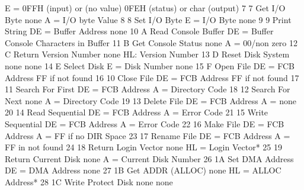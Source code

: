                                          E = 0FFH (input) or  (no value)
                                             0FEH (status) or 
                                             char (output)
 7           7   Get I/O Byte            none                 A = I/O byte
                                                               Value
 8           8   Set I/O Byte            E = I/O Byte         none
 9           9   Print String            DE = Buffer Address  none
10           A   Read Console Buffer     DE = Buffer          Console
                                                               Characters
                                                               in Buffer
11           B   Get Console Status      none                 A = 00/non zero
12           C   Return Version Number   none                 HL: Version
                                                                 Number
13           D   Reset Disk System       none                   none
14           E   Select Disk             E = Disk Number        none
15           F   Open File               DE = FCB Address       FF if not found
16          10   Close File              DE = FCB Address       FF if not found
17          11   Search For First        DE = FCB Address       A = Directory
                                                                  Code
18          12   Search For Next         none                   A = Directory
                                                                  Code
19          13   Delete File             DE = FCB Address       A = none
20          14   Read Sequential         DE = FCB Address       A = Error Code
21          15   Write Sequential        DE = FCB Address       A = Error Code
22          16   Make File               DE = FCB Address       A = FF if no DIR
                                                                  Space
23          17   Rename File             DE = FCB Address       A = FF in not
                                                                  found
24          18   Return Login Vector     none                   HL = Login
                                                                   Vector*
25          19   Return Current Disk     none                   A = Current Disk
                                                                  Number
26          1A   Set DMA Address         DE = DMA Address       none
27          1B   Get ADDR (ALLOC)        none                   HL = ALLOC
                                                                   Address*
28          1C   Write Protect Disk      none                   none
